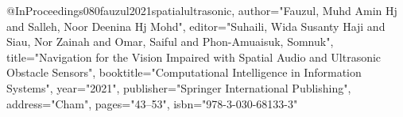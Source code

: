 @InProceedings{080fauzul2021spatialultrasonic,
author="Fauzul, Muhd Amin Hj
and Salleh, Noor Deenina Hj Mohd",
editor="Suhaili, Wida Susanty Haji
and Siau, Nor Zainah
and Omar, Saiful
and Phon-Amuaisuk, Somnuk",
title="Navigation for the Vision Impaired with Spatial Audio and Ultrasonic Obstacle Sensors",
booktitle="Computational Intelligence in Information Systems",
year="2021",
publisher="Springer International Publishing",
address="Cham",
pages="43--53",
isbn="978-3-030-68133-3"
}